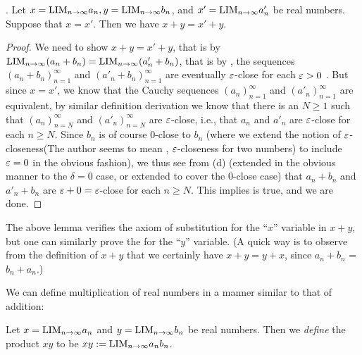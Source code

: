 \begin{lemma} \label{lem 5.3.7}.
Let \(x = \text{LIM}_{n \to \infty} a_n, y = \text{LIM}_{n \to \infty} b_n\), and \(x' = \text{LIM}_{n \to \infty} a'_n\) be real numbers.
Suppose that \(x = x'\).
Then we have \(x + y = x' + y\).
\end{lemma}

\begin{proof}
We need to show \(x + y = x' + y\), 
that is by  \(\text{LIM}_{n \to \infty} (a_n + b_n) = \text{LIM}_{n \to \infty} (a'_n + b_n)\), 
that is by , the sequences \((a_n + b_n)_{n = 1}^{\infty}\) and \((a'_n + b_n)_{n = 1}^{\infty}\) are eventually \(\varepsilon\)-close for each \(\varepsilon > 0\) . 
But since \(x = x'\), we know that the Cauchy sequences \((a_n)_{n = 1}^{\infty}\) and \((a'_n)_{n = 1}^{\infty}\) are equivalent, by similar definition derivation we know that there is an \(N \ge 1\) such that \((a_n)_{n = N}^{\infty}\) and \((a'_n)_{n = N}^{\infty}\) are \(\varepsilon\)-close,
i.e., that \(a_n\) and \(a'_n\) are \(\varepsilon\)-close for each \(n \ge N\).
Since \(b_n\) is of course \(0\)-close to \(b_n\)
(where we extend the notion of \(\varepsilon\)-closeness(The author seems to mean , \(\varepsilon\)-closeness for two numbers) to include \(\varepsilon=0\) in the obvious fashion),
we thus see from (d)
(extended in the obvious manner to the \(\delta =  0\) case, or extended to cover the \(0\)-close case)
that \(a_n + b_n\) and \(a'_n + b_n\) are \(\varepsilon + 0 = \varepsilon\)-close for each \(n \ge N\).
This implies  is true, and we are done.
\end{proof}

\begin{remark} \label{remark 5.3.8}
The above lemma verifies the axiom of substitution  for the ``\(x\)'' variable in \(x + y\),
but one can similarly prove the  for the ``\(y\)'' variable.
(A quick way is to observe from the definition of \(x + y\) that we certainly have \(x + y = y + x\), since \(a_n + b_n\) = \(b_n + a_n\).)
\end{remark}

We can define multiplication of real numbers in a manner similar to that of addition:

\begin{definition}  \label{def 5.3.9}
Let \(x = \text{LIM}_{n \to \infty} a_n\) and \(y = \text{LIM}_{n \to \infty} b_n\) be real numbers.
Then we \emph{define} the product \(xy\) to be \(xy :=  \text{LIM}_{n \to \infty} a_n b_n\).
\end{definition}

